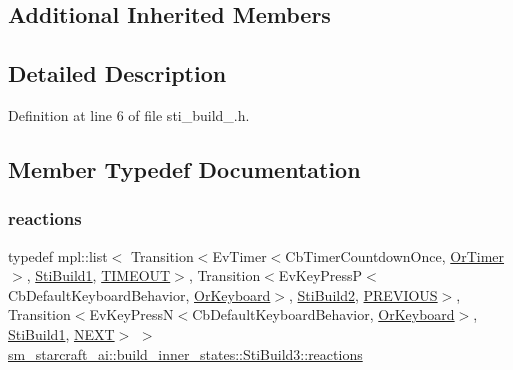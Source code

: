 \subsection*{Additional Inherited Members}


\subsection{Detailed Description}


Definition at line 6 of file sti\+\_\+build\+\_.\+h.



\subsection{Member Typedef Documentation}
\mbox{\label{structsm__starcraft__ai_1_1build__inner__states_1_1StiBuild3_a2b857ab01ffed639b605c5931f610676}} 
\subsubsection{\texorpdfstring{reactions}{reactions}}
{\footnotesize\ttfamily typedef mpl\+::list$<$ Transition$<$Ev\+Timer$<$Cb\+Timer\+Countdown\+Once, \hyperlink{classsm__starcraft__ai_1_1OrTimer}{Or\+Timer}$>$, \hyperlink{structsm__starcraft__ai_1_1build__inner__states_1_1StiBuild1}{Sti\+Build1}, \hyperlink{structsm__starcraft__ai_1_1build__inner__states_1_1StiBuild3_1_1TIMEOUT}{T\+I\+M\+E\+O\+UT}$>$, Transition$<$Ev\+Key\+PressP$<$Cb\+Default\+Keyboard\+Behavior, \hyperlink{classsm__starcraft__ai_1_1OrKeyboard}{Or\+Keyboard}$>$, \hyperlink{structsm__starcraft__ai_1_1build__inner__states_1_1StiBuild2}{Sti\+Build2}, \hyperlink{structsm__starcraft__ai_1_1build__inner__states_1_1StiBuild3_1_1PREVIOUS}{P\+R\+E\+V\+I\+O\+US}$>$, Transition$<$Ev\+Key\+PressN$<$Cb\+Default\+Keyboard\+Behavior, \hyperlink{classsm__starcraft__ai_1_1OrKeyboard}{Or\+Keyboard}$>$, \hyperlink{structsm__starcraft__ai_1_1build__inner__states_1_1StiBuild1}{Sti\+Build1}, \hyperlink{structsm__starcraft__ai_1_1build__inner__states_1_1StiBuild3_1_1NEXT}{N\+E\+XT}$>$ $>$ \hyperlink{structsm__starcraft__ai_1_1build__inner__states_1_1StiBuild3_a2b857ab01ffed639b605c5931f610676}{sm\+\_\+starcraft\+\_\+ai\+::build\+\_\+inner\+\_\+states\+::\+Sti\+Build3\+::reactions}}




